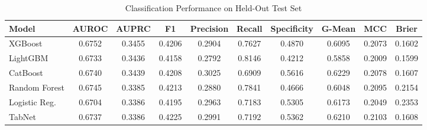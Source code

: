 \begin{table}
\centering
\caption{Classification Performance on Held-Out Test Set}
\label{tab:results}
\begin{tabular}{lccccccccc}
\toprule
Model & AUROC & AUPRC & F1 & Precision & Recall & Specificity & G-Mean & MCC & Brier \\
\midrule
XGBoost & 0.6752 & 0.3455 & 0.4206 & 0.2904 & 0.7627 & 0.4870 & 0.6095 & 0.2073 & 0.1602 \\
LightGBM & 0.6733 & 0.3436 & 0.4158 & 0.2792 & 0.8146 & 0.4212 & 0.5858 & 0.2009 & 0.1599 \\
CatBoost & 0.6740 & 0.3439 & 0.4208 & 0.3025 & 0.6909 & 0.5616 & 0.6229 & 0.2078 & 0.1607 \\
Random Forest & 0.6745 & 0.3385 & 0.4213 & 0.2880 & 0.7841 & 0.4666 & 0.6048 & 0.2095 & 0.2154 \\
Logistic Reg. & 0.6704 & 0.3386 & 0.4195 & 0.2963 & 0.7183 & 0.5305 & 0.6173 & 0.2049 & 0.2353 \\
TabNet & 0.6737 & 0.3386 & 0.4225 & 0.2991 & 0.7192 & 0.5362 & 0.6210 & 0.2103 & 0.1608 \\
\bottomrule
\end{tabular}
\end{table}
